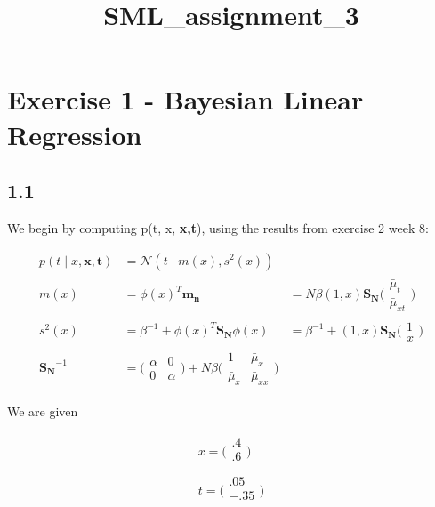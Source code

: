 \documentclass[11pt]{article}
\title{SML\_assignment\_3}
\begin{document}
    
    
    \maketitle
    
    

    
    \section{Exercise 1 - Bayesian Linear
Regression}\label{exercise-1---bayesian-linear-regression}

    \subsection{1.1}\label{section}

    We begin by computing p(t, x, \textbf{x,t}), using the results from
exercise 2 week 8:

\begin{align*}
p(t \mid x, \boldsymbol{x},\boldsymbol{t})  &= \mathcal{N} (t \mid m(x), s^2(x)) \\
m(x)      &= \phi(x)^T \boldsymbol{m_n} &= N \beta (1, x) \boldsymbol{S_N} \big( \begin{array}{c} \bar \mu_t \\ \bar \mu_{xt} \end{array} \big)\\
s^2(x) &= \beta ^{-1} + \phi(x)^T \boldsymbol{S_N} \phi(x) &= \beta^{-1} + (1,x) \boldsymbol{S_{N}} \big( \begin{array}{c} 1 \\ x \end{array}\big)\\
\boldsymbol{S_{N}}^{-1} &= \big( \begin{array}{cc} \alpha & 0 \\ 0 & \alpha \end{array}\big) + N \beta \big( \begin{array}{cc} 1 & \bar \mu_x \\ \bar \mu_x & \bar \mu_{xx} \end{array} \big)
\end{align*}

    We are given

\begin{align*}
x  = \big (\begin{array}{c}
.4\\
.6\\
\end{array} \big) \\
t  = \big( \begin{array}{c}
.05\\
-.35\\
\end{array} \big)
\end{align*}
\end{document}
